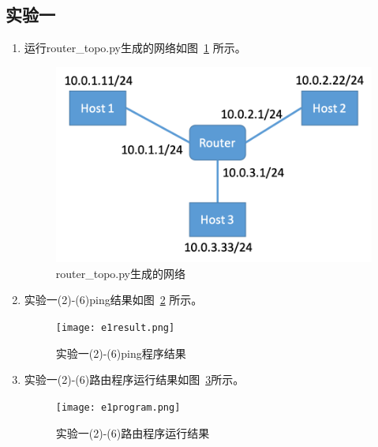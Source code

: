 \documentclass{zjureport}
\begin{document}
  \subsection{实验一}
      \begin{enumerate}
          \item 运行router\_topo.py生成的网络如图~\ref{fig:rtpy} 所示。
                \begin{figure}[!htbp]
                    \centering
                    \includegraphics[width=0.7\linewidth]{figures/rtpy.png}
                    \caption{router\_topo.py生成的网络}
                    \label{fig:rtpy}
                \end{figure}

          \item 实验一(2)-(6)ping结果如图~\ref{fig:e1result} 所示。
                \begin{figure}[!htbp]
                    \centering
                    \texttt{[image: e1result.png]}
                    \caption{实验一(2)-(6)ping程序结果}
                    \label{fig:e1result}
                \end{figure}

         \item 实验一(2)-(6)路由程序运行结果如图~\ref{fig:e1program}所示。
                 \begin{figure}[!htbp]
                     \centering
                     \texttt{[image: e1program.png]}
                     \caption{实验一(2)-(6)路由程序运行结果}
                     \label{fig:e1program}
                 \end{figure}

      \end{enumerate}

  \newpage
\end{document}
